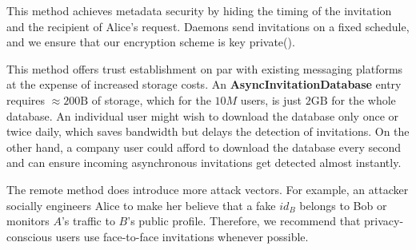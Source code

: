 This method achieves metadata security by hiding the timing of the invitation and the recipient of Alice's request. Daemons send invitations on a fixed schedule, and we ensure that our encryption scheme is key private().
    
This method offers trust establishment on par with existing messaging platforms at the expense of increased storage costs. An \textbf{AsyncInvitationDatabase} entry requires $\approx200\text{B}$ of storage, which for the $10M$ users, is just $2\text{GB}$ for the whole database. An individual user might wish to download the database only once or twice daily, which saves bandwidth but delays the detection of invitations. On the other hand, a company user could afford to download the database every second and can ensure incoming asynchronous invitations get detected almost instantly.

The remote method does introduce more attack vectors. For example, an attacker socially engineers Alice to make her believe that a fake $id_B$ belongs to Bob or monitors $A$'s traffic to $B$'s public profile. Therefore, we recommend that privacy-conscious users use face-to-face invitations whenever possible.